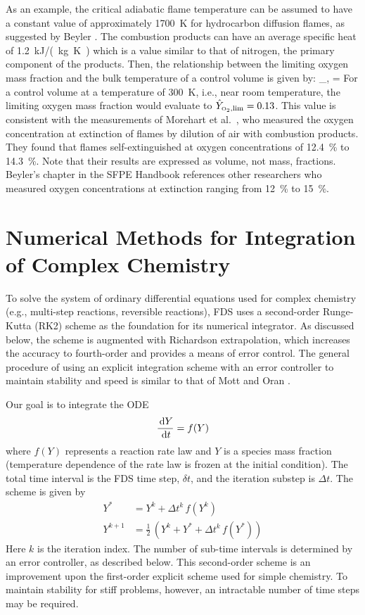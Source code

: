 As an example, the critical adiabatic flame temperature can be assumed to have a constant value of approximately 1700~K for hydrocarbon diffusion flames, as suggested by Beyler \cite{SFPE:Beyler}. The combustion products can have an average specific heat of \SI{1.2}{kJ/(kg.K)} which is a value similar to that of nitrogen, the primary component of the products. Then, the relationship between the limiting oxygen mass fraction and the bulk temperature of a control volume is given by:
\be
   _{\OTWO,\lim} =  \approx  {}  \label{extinction_model}
\ee
For a control volume at a temperature of \SI{300}{K}, i.e., near room temperature, the limiting oxygen mass fraction would evaluate to $\hat{Y}_{\text{\tiny \hbox{O}$_2$},\lim}=0.13$.  This value is consistent with the measurements of Morehart et al.~\cite{Morehart:1991}, who measured the oxygen concentration at extinction of flames by dilution of air with combustion products. They found that flames self-extinguished at oxygen concentrations of 12.4~\% to 14.3~\%. Note that their results are expressed as volume, not mass, fractions. Beyler's chapter in the SFPE Handbook references other researchers who measured oxygen concentrations at extinction ranging from 12~\% to 15~\%.



\chapter{Numerical Methods for Integration of Complex Chemistry}
\label{chemistry_integration}

To solve the system of ordinary differential equations used for complex chemistry (e.g., multi-step reactions, reversible reactions), FDS uses a second-order Runge-Kutta (RK2) scheme as the foundation for its numerical integrator.  As discussed below, the scheme is augmented with Richardson extrapolation, which increases the accuracy to fourth-order and provides a means of error control. The general procedure of using an explicit integration scheme with an error controller to maintain stability and speed is similar to that of Mott and Oran \cite{Mott:2001}.

Our goal is to integrate the ODE
\begin{equation}
\frac{\,\mathrm{d} Y}{\,\mathrm{d} t} = f(Y)
\end{equation}
where $f(Y)$ represents a reaction rate law and $Y$ is a species mass fraction (temperature dependence of the rate law is frozen at the initial condition).  The total time interval is the FDS time step, $\delta t$, and the iteration substep is $\Delta t$. The scheme is given by
\begin{align}
\label{RK2-1} Y^* &= Y^k + \Delta t^k \, f(Y^k) \\
\label{RK2-2} Y^{k+1}   &= \frac{1}{2}\,(Y^k + Y^* + \Delta t^k \, f(Y^*))
\end{align}
Here $k$ is the iteration index.  The number of sub-time intervals is determined by an error controller, as described below. This second-order scheme is an improvement upon the first-order explicit scheme used for simple chemistry. To maintain stability for stiff problems, however, an intractable number of time steps may be required.

